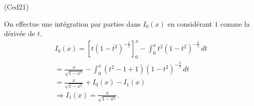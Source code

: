 \begin{tiny}(Ced21)\end{tiny} On effectue une intégration par parties dans $I_0(x)$ en considérant $1$ comme la dérivée de $t$.
\begin{multline*}
  I_0(x) = 
  \left[ t (1-t^2)^{-\frac{1}{2}}\right]_0^x 
  - \int_0^x t^2 (1-t^2)^{-\frac{3}{2}}\, dt \\
  = \frac{x}{\sqrt{1-x^2}} - \int_0^x (t^2 -1 + 1) (1-t^2)^{-\frac{3}{2}}\, dt \\
  = \frac{x}{\sqrt{1-x^2}} + I_0(x) - I_1(x) \\
  \Rightarrow 
  I_1(x) = \frac{x}{\sqrt{1-x^2}}.
\end{multline*}

